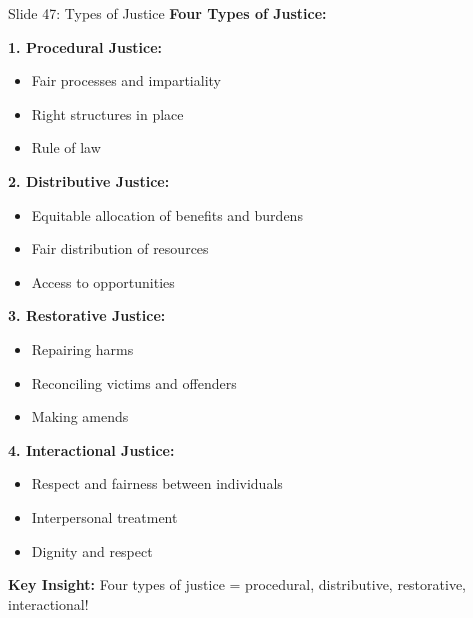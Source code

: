 \documentclass[8pt]{beamer}
\begin{document}
	\begin{frame}{Slide 47: Types of Justice}
		\fontsize{6.5}{7.5}\selectfont
		\textbf{Four Types of Justice:}
		
		\vspace{0.1cm}
		\textbf{1. Procedural Justice:}
		\begin{itemize}
			\item Fair processes and impartiality
			\item Right structures in place
			\item Rule of law
		\end{itemize}
		
		\vspace{0.1cm}
		\textbf{2. Distributive Justice:}
		\begin{itemize}
			\item Equitable allocation of benefits and burdens
			\item Fair distribution of resources
			\item Access to opportunities
		\end{itemize}
		
		\vspace{0.1cm}
		\textbf{3. Restorative Justice:}
		\begin{itemize}
			\item Repairing harms
			\item Reconciling victims and offenders
			\item Making amends
		\end{itemize}
		
		\vspace{0.1cm}
		\textbf{4. Interactional Justice:}
		\begin{itemize}
			\item Respect and fairness between individuals
			\item Interpersonal treatment
			\item Dignity and respect
		\end{itemize}
		
		\textcolor{myblue}{\textbf{Key Insight:}} Four types of justice = \textcolor{myblue}{procedural, distributive, restorative, interactional}!
	\end{frame}
	
\end{document}
